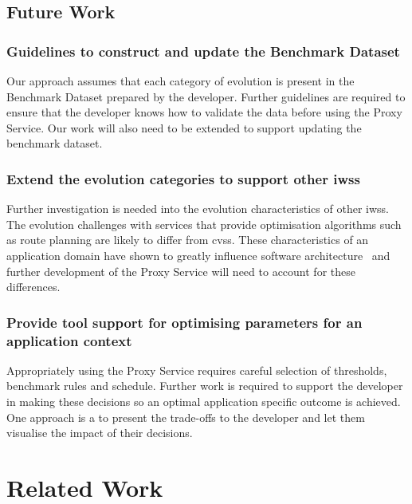 \subsection{Future Work}

\subsubsection{Guidelines to construct and update the Benchmark Dataset} Our approach assumes that each category of evolution is present in the Benchmark Dataset prepared by the developer. Further guidelines are required to ensure that the developer knows how to validate the data before using the Proxy Service. Our work will also need to be extended to support updating the benchmark dataset. 

\subsubsection{Extend the evolution categories to support other \glspl{iws}} Further investigation is needed into the evolution characteristics of other \glspl{iws}. The evolution challenges with services that provide optimisation algorithms such as route planning are likely to differ from \glspl{cvs}. These characteristics of an application domain have shown to greatly influence software architecture~\citep{Barnett:2018Kx} and further development of the Proxy Service will need to account for these differences. 

\subsubsection{Provide tool support for optimising parameters for an application context} Appropriately using the Proxy Service requires careful selection of thresholds, benchmark rules and schedule. Further work is required to support the developer in making these decisions so an optimal application specific outcome is achieved. One approach is a to present the trade-offs to the developer and let them visualise the impact of their decisions. 

\section{Related Work}
\label{fse2020:sec:related-work}



